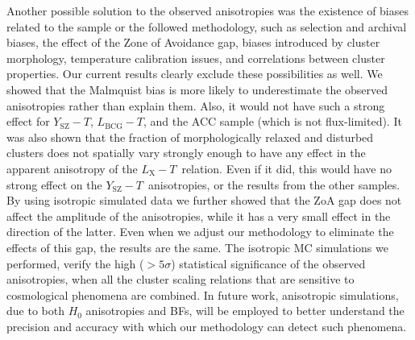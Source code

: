 \documentclass{aa}   %
\newcommand{\LT}{$L_{\text{X}}-T$}
\newcommand{\YT}{$Y_{\text{SZ}}-T$}
\newcommand{\LbcgT}{$L_{\text{BCG}}-T$}
\newcommand{\LY}{$L_{\text{X}}-Y_{\text{SZ}}$}
\newcommand{\Lx}{$L_{\text{X}}$}
\newcommand{\nhtot}{$N_{\text{Htot}}$}
\begin{document}


Another possible solution to the observed anisotropies was the existence of biases related to the sample or the followed methodology, such as selection and archival biases, the effect of the Zone of Avoidance gap, biases introduced by cluster morphology, temperature calibration issues, and correlations between cluster properties. Our current results clearly exclude these possibilities as well. We showed that the Malmquist bias is more likely to underestimate the observed anisotropies rather than explain them. Also, it would not have such a strong effect for \YT, \LbcgT, and the ACC sample (which is not flux-limited). It was also shown that the fraction of morphologically relaxed and disturbed clusters does not spatially vary strongly enough to have any effect in the apparent anisotropy of the \LT\ relation. Even if it did, this would have no strong effect on the \YT\ anisotropies, or the results from the other samples. By using isotropic simulated data we further showed that the ZoA gap does not affect the amplitude of the anisotropies, while it has a very small effect in the direction of the latter. Even when we adjust our methodology to eliminate the effects of this gap, the results are the same. The isotropic MC simulations we performed, verify the high ($>5\sigma$) statistical significance of the observed anisotropies, when all the cluster scaling relations that are sensitive to cosmological phenomena are combined. In future work, anisotropic simulations, due to both $H_0$ anisotropies and BFs, will be employed to better understand the precision and accuracy with which our methodology can detect such phenomena.
\end{document}
